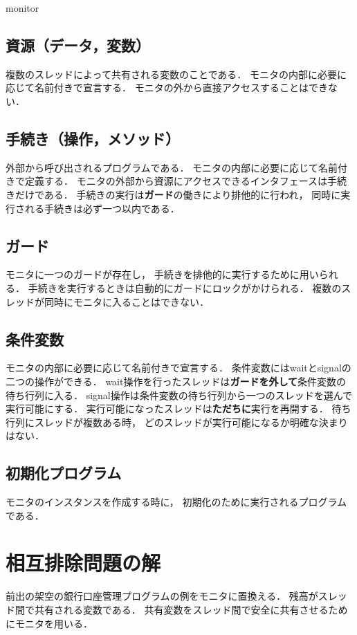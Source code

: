 {monitor}

\subsection{資源（データ，変数）}
複数のスレッドによって共有される変数のことである．
モニタの内部に必要に応じて名前付きで宣言する．
モニタの外から直接アクセスすることはできない．

\subsection{手続き（操作，メソッド）}
外部から呼び出されるプログラムである．
モニタの内部に必要に応じて名前付きで定義する．
モニタの外部から資源にアクセスできるインタフェースは手続きだけである．
手続きの実行は{\bf ガード}の働きにより排他的に行われ，
同時に実行される手続きは必ず一つ以内である．

\subsection{ガード}
モニタに一つのガードが存在し，
手続きを排他的に実行するために用いられる．
手続きを実行するときは自動的にガードにロックがかけられる．
複数のスレッドが同時にモニタに入ることはできない．

\subsection{条件変数}
モニタの内部に必要に応じて名前付きで宣言する．
条件変数にはwaitとsignalの二つの操作ができる．
wait操作を行ったスレッドは{\bf ガードを外して}条件変数の待ち行列に入る．
signal操作は条件変数の待ち行列から一つのスレッドを選んで実行可能にする．
実行可能になったスレッドは{\bf ただちに}実行を再開する．
待ち行列にスレッドが複数ある時，
どのスレッドが実行可能になるか明確な決まりはない．

\subsection{初期化プログラム}
モニタのインスタンスを作成する時に，
初期化のために実行されるプログラムである．

\section{相互排除問題の解}
前出の架空の銀行口座管理プログラムの例をモニタに置換える．
残高がスレッド間で共有される変数である．
共有変数をスレッド間で安全に共有させるためにモニタを用いる．

